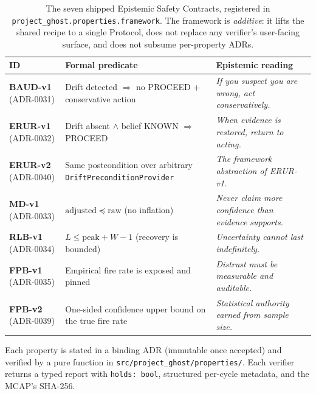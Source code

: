 \documentclass[11pt,a4paper]{article}
\begin{document}
\begin{table}[h]
\centering\small
\begin{tabularx}{\linewidth}{l X X}
\toprule
\textbf{ID} & \textbf{Formal predicate} & \textbf{Epistemic reading} \\
\midrule
\textbf{BAUD-v1} (ADR-0031) & Drift detected $\Rightarrow$ no PROCEED + conservative action & \emph{If you suspect you are wrong, act conservatively.} \\
\textbf{ERUR-v1} (ADR-0032) & Drift absent $\wedge$ belief KNOWN $\Rightarrow$ PROCEED & \emph{When evidence is restored, return to acting.} \\
\textbf{ERUR-v2} (ADR-0040) & Same postcondition over arbitrary \texttt{DriftPreconditionProvider} & \emph{The framework abstraction of ERUR-v1.} \\
\textbf{MD-v1} (ADR-0033)   & $\mathrm{adjusted} \preceq \mathrm{raw}$ (no inflation) & \emph{Never claim more confidence than evidence supports.} \\
\textbf{RLB-v1} (ADR-0034)  & $L \le \mathrm{peak} + W - 1$ (recovery is bounded) & \emph{Uncertainty cannot last indefinitely.} \\
\textbf{FPB-v1} (ADR-0035)  & Empirical fire rate is exposed and pinned & \emph{Distrust must be measurable and auditable.} \\
\textbf{FPB-v2} (ADR-0039)  & One-sided confidence upper bound on the true fire rate & \emph{Statistical authority earned from sample size.} \\
\bottomrule
\end{tabularx}
\caption{The seven shipped Epistemic Safety Contracts, registered
in \texttt{project\_ghost.properties.framework}. The framework is
\emph{additive}: it lifts the shared recipe to a single Protocol,
does not replace any verifier's user-facing surface, and does not
subsume per-property ADRs.}
\label{tab:epistemic}
\end{table}

Each property is stated in a binding ADR (immutable once
accepted) and verified by a pure function in
\texttt{src/project\_ghost/properties/}. Each verifier returns a
typed report with \texttt{holds: bool}, structured per-cycle
metadata, and the MCAP's SHA-256.
\end{document}
